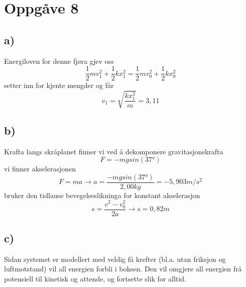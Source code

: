 \documentclass[12pt,a4paper]{article}
\begin{document}
  \section*{Oppgåve 8}
    \subsection*{a)}
    Energiloven for denne fjøra gjev oss
    \begin{equation}
      \frac{1}{2}mv_1^2 +
      \frac{1}{2}kx_1^2 =
      \frac{1}{2}mv_0^2 +
      \frac{1}{2}kx_0^2 
    \end{equation}
    setter inn for kjente mengder og får
    \begin{equation}
      v_1 = \sqrt{\frac{kx_1^2}{m}} = 3,11
    \end{equation}

    \subsection*{b)}
    Krafta langs skråplanet finner vi ved å dekomponere gravitasjonskrafta
    \begin{equation}
      F = -mgsin(\ang{37})
    \end{equation}
    vi finner akselerasjonen
    \begin{equation}
      F=ma \rightarrow a = \frac{-mgsin(\ang{37})}{2,00kg} = -5,903 m/s^2
    \end{equation}
    bruker den tidlause bevegelseslikninga for konstant akselerasjon
    \begin{equation}
      s = \frac{v^2 - v_0^2}{2a} \rightarrow s = 0,82m
    \end{equation}
    
    \subsection*{c)}
    Sidan systemet er modellert med veldig få krefter (bl.a. utan friksjon og luftmotstand)
    vil all energien forbli i boksen. Den vil omgjere all energien frå potensiell til
    kinetisk og attende, og fortsette slik for alltid.
\end{document}
